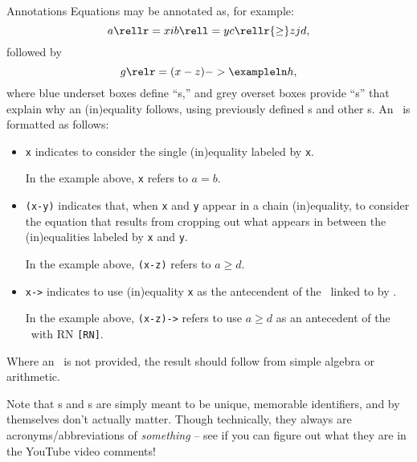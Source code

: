 \begin{part}{Annotations}
  Equations may be annotated as, for example:
  $$a \rellr = x i b \rell = y c \rellr {\ge} z j d,$$
  followed by
  $$g \relr = {(x-z)->\exampleln} h,$$
  where blue underset boxes define ``s,''
  and grey overset boxes provide ``\explnl{}s'' that explain why an (in)equality follows, 
  using previously defined s and other s.
  An \explnl\ is formatted as follows:
  \begin{itemize}
    \item {}  {\tt x} indicates to consider the single (in)equality labeled by {\tt x}.

      In the example above, {\tt x} refers to $a = b$.
    \item {}  {\tt (x-y)} indicates that, when {\tt x} and {\tt y} appear in a chain (in)equality,
      to consider the equation that results from cropping out what appears 
      in between the (in)equalities labeled by {\tt x} and {\tt y}.

      In the example above, {\tt(x-z)} refers to $a \ge d$.
    \item {}  {\tt x->\exampleln} indicates to use (in)equality {\tt x}
      as the antecendent of the \ linked to by \exampleln.

      In the example above, {\tt(x-z)->\exampleln} refers to use $a \ge d$
      as an antecedent of the \ with RN {\tt[RN]}.
  \end{itemize}
   Where an \explnl\ is not provided, the result should follow from simple algebra or arithmetic.

  Note that s and s are simply meant to be unique, memorable identifiers, and by themselves don't actually matter. 
  Though technically, they always are acronyms/abbreviations of {\it something} --
  see if you can figure out what they are in the YouTube video comments!
\end{part}

